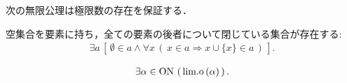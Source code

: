 	次の無限公理は極限数の存在を保証する．
	
	\begin{screen}
		\begin{axm}[無限公理]
			空集合を要素に持ち，全ての要素の後者について閉じている集合が存在する:
			\begin{align}
				\exists a\, \left[\, \emptyset \in a
				\wedge \forall x\, \left(\, x \in a \Longrightarrow x \cup \{x\} \in a\, \right)\, \right].
			\end{align}
		\end{axm}
	\end{screen}
	
	\begin{screen}
		\begin{thm}[極限数は存在する]
			\begin{align}
				\exists \alpha \in \mathrm{ON}\, \left(\, \mathrm{lim.o}\left(\alpha\right)\, \right).
			\end{align}
		\end{thm}
	\end{screen}
	
